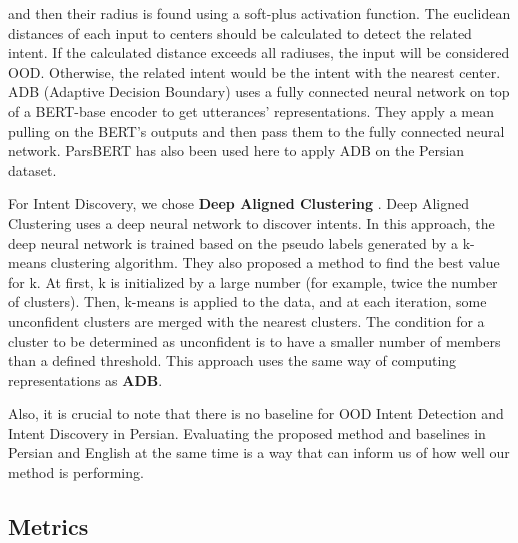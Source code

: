 \documentclass{article}
\begin{document}
\begin{itemize}
                                          and then their radius is found using a soft-plus activation function. 
                                          The euclidean distances of each input to centers should be calculated to detect the related intent. 
                                          If the calculated distance exceeds all radiuses, the input will be considered OOD. Otherwise, 
                                          the related intent would be the intent with the nearest center. 
                                          ADB (Adaptive Decision Boundary) uses a fully connected neural network on top of a BERT-base encoder to get utterances' representations. 
                                          They apply a mean pulling on the BERT's outputs and then pass them to the fully connected neural network.
                                          ParsBERT has also been used here to apply ADB on the Persian dataset.
\end{itemize}
For Intent Discovery, we chose \textbf{Deep Aligned Clustering} \citep{zhang2021discovering}.
Deep Aligned Clustering uses a deep neural network to discover intents. 
In this approach, the deep neural network is trained based on the pseudo labels generated by a k-means clustering algorithm. 
They also proposed a method to find the best value for k. At first, k is initialized by a large number (for example, twice the number of clusters). 
Then, k-means is applied to the data, and at each iteration, some unconfident clusters are merged with the nearest clusters. 
The condition for a cluster to be determined as unconfident is to have a smaller number of members than a defined threshold.
This approach uses the same way of computing representations as \textbf{ADB}.

Also, it is crucial to note that there is no baseline for OOD Intent Detection and Intent Discovery in Persian.
Evaluating the proposed method and baselines in Persian and English at the same time is a way that can inform us of how well our method is performing.

\subsection{Metrics}
\end{document}
